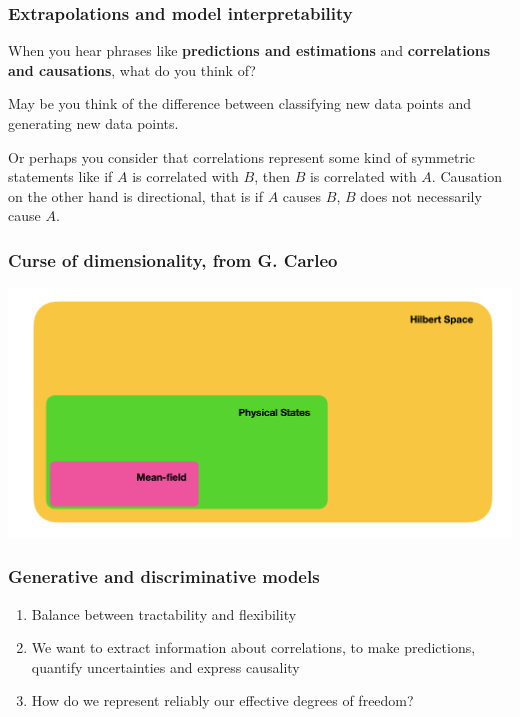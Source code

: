 \documentclass[11pt]{beamer} %
\begin{document}
\begin{frame}
\frametitle{Extrapolations and model interpretability}

When you hear phrases like \textbf{predictions and estimations} and
\textbf{correlations and causations}, what do you think of?

May be you think
of the difference between classifying new data points and generating
new data points.

Or perhaps you consider that correlations represent some kind of symmetric statements like
if $A$ is correlated with $B$, then $B$ is correlated with
$A$. Causation on the other hand is directional, that is if $A$ causes $B$, $B$ does not
necessarily cause $A$.
\end{frame}

\begin{frame}
\frametitle{Curse of dimensionality, from G. Carleo}

\vspace{6mm}

\centerline{\includegraphics[width=1.0\linewidth]{figures/spaces.png}}

\vspace{6mm}
\end{frame}


\begin{frame}
\frametitle{Generative and discriminative models}

\begin{enumerate}
\item Balance between tractability and flexibility

\item We want to extract information about correlations, to make predictions, quantify uncertainties and express causality

\item How do we represent reliably our effective degrees of freedom?
\end{enumerate}

\noindent
\end{frame}
\end{document}

